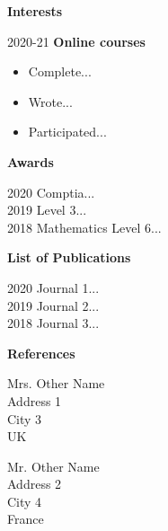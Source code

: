 \documentclass[11pt]{report}
\begin{document}
\textbf{Interests} 

2020-21 \qquad \textbf{Online courses} 
\begin{itemize}
	\item Complete...
	\item Wrote... 
	\item Participated...
\end{itemize}

\textbf{Awards} 

2020 \space\space\space \qquad Comptia... \\ 
2019 \space\space\space \qquad Level 3... \\ 
2018 \space\space\space \qquad Mathematics Level 6...

\textbf{List of Publications} 

2020 \space\space\space \qquad Journal 1... \\ 
2019 \space\space\space \qquad Journal 2... \\ 
2018 \space\space\space \qquad Journal 3... 

\textbf{References} 

\begin{center}
	\begin{multicols}{2}
		Mrs. Other Name \\
		Address 1 \\
		City 3 \\
		UK 
		
		\columnbreak
		
		Mr. Other Name \\
		Address 2\\
		City 4 \\
		France
	\end{multicols}
\end{center}
\end{document}
